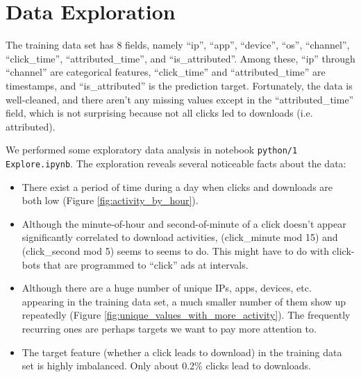 \documentclass[12pt]{article}
\begin{document}
\section{Data Exploration}
The training data set has 8 fields, namely ``ip'', ``app'', ``device'', ``os'', ``channel'', ``click\_time'', ``attributed\_time'', and ``is\_attributed''.
Among these, ``ip'' through ``channel'' are categorical features, ``click\_time'' and ``attributed\_time'' are timestamps, and ``is\_attributed'' is the prediction target. 
Fortunately, the data is well-cleaned, and there aren't any missing values except in the ``attributed\_time'' field, which is not surprising because not all clicks led to downloads (i.e. attributed).

We performed some exploratory data analysis in notebook \texttt{python/1 Explore.ipynb}.
The exploration reveals several noticeable facts about the data:
\begin{itemize}
    \item There exist a period of time during a day when clicks and downloads are both low (Figure \ref{fig:activity_by_hour}).
    \item Although the minute-of-hour and second-of-minute of a click doesn't appear significantly correlated to download activities, (click\_minute mod 15) and (click\_second mod 5) seems to seems to do. This might have to do with click-bots that are programmed to ``click'' ads at intervals.
    \item Although there are a huge number of unique IPs, apps, devices, etc. appearing in the training data set, a much smaller number of them show up repeatedly (Figure \ref{fig:unique_values_with_more_activity}). The frequently recurring ones are perhaps targets we want to pay more attention to.
    \item The target feature (whether a click leads to download) in the training data set is highly imbalanced. Only about 0.2\% clicks lead to downloads.
\end{itemize}
\end{document}
